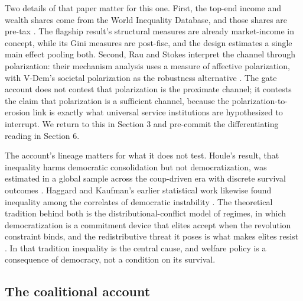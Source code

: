 Two details of that paper matter for this one. First, the top-end income and wealth shares come from the World Inequality Database, and those shares are pre-tax \citep{RauStokes2025}. The flagship result's structural measures are already market-income in concept, while its Gini measures are post-fisc, and the design estimates a single main effect pooling both. Second, Rau and Stokes interpret the channel through polarization: their mechanism analysis uses a measure of affective polarization, with V-Dem's societal polarization as the robustness alternative \citep{RauStokes2025, Svolik2019}. The gate account does not contest that polarization is the proximate channel; it contests the claim that polarization is a sufficient channel, because the polarization-to-erosion link is exactly what universal service institutions are hypothesized to interrupt. We return to this in Section 3 and pre-commit the differentiating reading in Section 6.

The account's lineage matters for what it does not test. Houle's result, that inequality harms democratic consolidation but not democratization, was estimated in a global sample across the coup-driven era with discrete survival outcomes \citep{Houle2009}. Haggard and Kaufman's earlier statistical work likewise found inequality among the correlates of democratic instability \citep{HaggardKaufman2012}. The theoretical tradition behind both is the distributional-conflict model of regimes, in which democratization is a commitment device that elites accept when the revolution constraint binds, and the redistributive threat it poses is what makes elites resist \citep{AcemogluRobinson2006, Boix2003, AnsellSamuels2014}. In that tradition inequality is the central cause, and welfare policy is a consequence of democracy, not a condition on its survival.

\subsection{The coalitional account}

